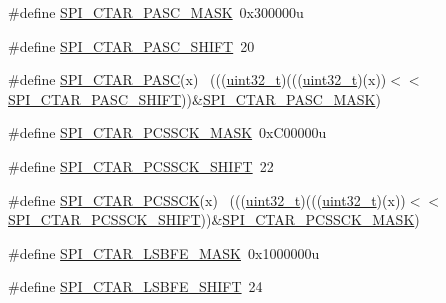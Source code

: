 \begin{DoxyCompactItemize}
\item 
\#define \hyperlink{group___s_p_i___register___masks_ga3e9fd2ca2e90b6c40db0d51c8d8baa84}{S\+P\+I\+\_\+\+C\+T\+A\+R\+\_\+\+P\+A\+S\+C\+\_\+\+M\+A\+SK}~0x300000u
\item 
\#define \hyperlink{group___s_p_i___register___masks_ga7883643ad4e73cc46c7a140375a2be7a}{S\+P\+I\+\_\+\+C\+T\+A\+R\+\_\+\+P\+A\+S\+C\+\_\+\+S\+H\+I\+FT}~20
\item 
\#define \hyperlink{group___s_p_i___register___masks_ga5d50f3bff4f3b953457acd24cad45a43}{S\+P\+I\+\_\+\+C\+T\+A\+R\+\_\+\+P\+A\+SC}(x)                                              ~(((\hyperlink{_p_e___types_8h_a33594304e786b158f3fb30289278f5af}{uint32\+\_\+t})(((\hyperlink{_p_e___types_8h_a33594304e786b158f3fb30289278f5af}{uint32\+\_\+t})(x))$<$$<$\hyperlink{group___s_p_i___register___masks_ga7883643ad4e73cc46c7a140375a2be7a}{S\+P\+I\+\_\+\+C\+T\+A\+R\+\_\+\+P\+A\+S\+C\+\_\+\+S\+H\+I\+FT}))\&\hyperlink{group___s_p_i___register___masks_ga3e9fd2ca2e90b6c40db0d51c8d8baa84}{S\+P\+I\+\_\+\+C\+T\+A\+R\+\_\+\+P\+A\+S\+C\+\_\+\+M\+A\+SK})
\item 
\#define \hyperlink{group___s_p_i___register___masks_ga27ec6f89727e91f1d272d06c6f1c44b3}{S\+P\+I\+\_\+\+C\+T\+A\+R\+\_\+\+P\+C\+S\+S\+C\+K\+\_\+\+M\+A\+SK}~0x\+C00000u
\item 
\#define \hyperlink{group___s_p_i___register___masks_ga8bb5e598d3bbadd3efc273c57bc522ab}{S\+P\+I\+\_\+\+C\+T\+A\+R\+\_\+\+P\+C\+S\+S\+C\+K\+\_\+\+S\+H\+I\+FT}~22
\item 
\#define \hyperlink{group___s_p_i___register___masks_ga758b6b07db9746754a43ab38b28c519a}{S\+P\+I\+\_\+\+C\+T\+A\+R\+\_\+\+P\+C\+S\+S\+CK}(x)                                          ~(((\hyperlink{_p_e___types_8h_a33594304e786b158f3fb30289278f5af}{uint32\+\_\+t})(((\hyperlink{_p_e___types_8h_a33594304e786b158f3fb30289278f5af}{uint32\+\_\+t})(x))$<$$<$\hyperlink{group___s_p_i___register___masks_ga8bb5e598d3bbadd3efc273c57bc522ab}{S\+P\+I\+\_\+\+C\+T\+A\+R\+\_\+\+P\+C\+S\+S\+C\+K\+\_\+\+S\+H\+I\+FT}))\&\hyperlink{group___s_p_i___register___masks_ga27ec6f89727e91f1d272d06c6f1c44b3}{S\+P\+I\+\_\+\+C\+T\+A\+R\+\_\+\+P\+C\+S\+S\+C\+K\+\_\+\+M\+A\+SK})
\item 
\#define \hyperlink{group___s_p_i___register___masks_gadefae41f4962681a83ae61a653026dc2}{S\+P\+I\+\_\+\+C\+T\+A\+R\+\_\+\+L\+S\+B\+F\+E\+\_\+\+M\+A\+SK}~0x1000000u
\item 
\#define \hyperlink{group___s_p_i___register___masks_ga5f3c8977a22e59cab407497ba5e32dc9}{S\+P\+I\+\_\+\+C\+T\+A\+R\+\_\+\+L\+S\+B\+F\+E\+\_\+\+S\+H\+I\+FT}~24

\end{DoxyCompactItemize}
